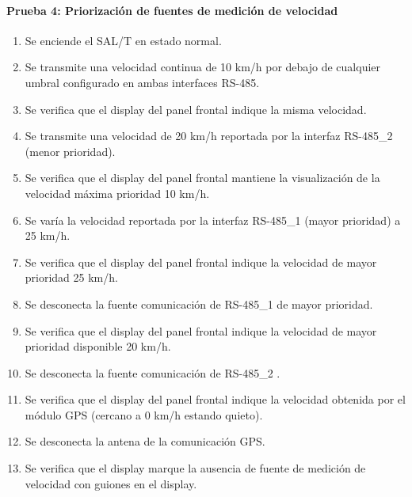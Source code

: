 \paragraph{Prueba 4: Priorización de fuentes de medición de velocidad}
\begin{enumerate}
\item	Se enciende el SAL/T en estado normal.
\item	Se transmite una velocidad continua de 10 km/h por debajo de cualquier umbral configurado en ambas interfaces RS-485.
\item	Se verifica que el display del panel frontal indique la misma velocidad.
\item	Se transmite una velocidad de 20 km/h reportada por la interfaz RS-485\_2 (menor prioridad).
\item	Se verifica que el display del panel frontal mantiene la visualización de la velocidad máxima prioridad 10 km/h.
\item	Se varía la velocidad reportada por la interfaz RS-485\_1 (mayor prioridad) a 25 km/h.
\item	Se verifica que el display del panel frontal indique la velocidad de mayor prioridad 25 km/h.
\item	Se desconecta la fuente comunicación de RS-485\_1 de mayor prioridad.
\item	Se verifica que el display del panel frontal indique la velocidad de mayor prioridad disponible 20 km/h.
\item	Se desconecta la fuente comunicación de RS-485\_2 .
\item	Se verifica que el display del panel frontal indique la velocidad obtenida por el módulo GPS (cercano a 0 km/h estando quieto).
\item	Se desconecta la antena de la comunicación GPS.
\item	Se verifica que el display marque la ausencia de fuente de medición de velocidad con guiones en el display.

\end{enumerate}

